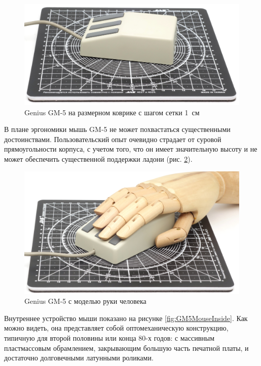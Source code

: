 \documentclass[11pt, a4paper]{article}
\begin{document}
\begin{figure}[h]
    \centering
    \includegraphics[scale=0.51]{1987_genius_gm5_mouse/size_30.jpg}
    \caption{Genius GM-5 на размерном коврике с шагом сетки 1~см}
    \label{fig:GM5MouseSize}
\end{figure}

В плане эргономики мышь GM-5 не может похвастаться существенными достоинствами. Пользовательский опыт очевидно страдает от суровой прямоугольности корпуса, с учетом того, что он имеет значительную высоту и не может обеспечить существенной поддержки ладони (рис. \ref{fig:GM5MouseHand}).

\begin{figure}[h]
    \centering
    \includegraphics[scale=0.51]{1987_genius_gm5_mouse/hand_30.jpg}
    \caption{Genius GM-5 с моделью руки человека}
    \label{fig:GM5MouseHand}
\end{figure}

Внутреннее устройство мыши показано на рисунке \ref{fig:GM5MouseInside}. Как можно видеть, она представляет собой оптомеханическую конструкцию, типичную для второй половины или конца 80-х годов: с массивным пластмассовым обрамлением, закрывающим большую часть печатной платы, и достаточно долговечными латунными роликами.
\end{document}
